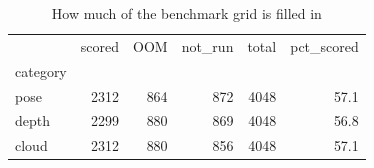 \begin{table}
\caption{How much of the benchmark grid is filled in}
\label{tab:t7_completion}
\begin{tabular}{lrrrrr}
\toprule
 & scored & OOM & not\_run & total & pct\_scored \\
category &  &  &  &  &  \\
\midrule
pose & 2312 & 864 & 872 & 4048 & 57.1 \\
depth & 2299 & 880 & 869 & 4048 & 56.8 \\
cloud & 2312 & 880 & 856 & 4048 & 57.1 \\
\bottomrule
\end{tabular}
\end{table}
